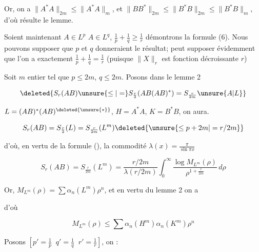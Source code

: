 Or, on a $\|A^*A\|_{2m}\leq\|A^*A\|_m$, et
$\|BB^*\|_{2m}\leq\|B^*B\|_{2m}\leq\|B^*B\|_m$, d'où résulte le lemme.

Soient maintenant  $A\in L^p$ $A\in L^q$, $\frac1p+\frac1q\geq\frac1r$ démontrons la formule (6). Nous pouvons supposer  que $p$ et $q$    donneraient le résultat;   peut supposer évidemment  que l'on a exactement $\frac1p+\frac1q=\frac1r$ (puisque $\|X\|_r$ est fonction décroissante  $r$)

Soit $m$  entier tel que $p\leq 2m$, $q\leq 2m$.  Posons  dans le lemme 2


\[
\deleted{S_r(AB)\unsure{\leq|=} S_{\frac r2}(AB(AB)^*)=S_{\frac r{2m}}\unsure{A|L}}
\]

$L=(AB)^*(AB)^{\deleted{\unsure{*}}}$, $H=A^*A$, $K=B^*B$, on aura.

\[
S_r(AB)=S_{\frac r2}(L)=S_{\frac r{2m}}(L^m)\deleted{\unsure{\leq p+2m|=r/2m}}
\]

d'où, en vertu de la formule (),   la commodité $\lambda(x)=\frac{\pi}{\sin\pi x}$

\[
S_r(AB)=S_{\frac r{2m}}(L^m)=\frac{r/2m}{\lambda(r/2m)}
\int_0^\infty\frac{\log M_{L^m}(\rho)}{\rho^{1+\frac r{2m}}}\,d\rho \tag*{(11)}
\]

 Or, $M_{L^m}(\rho)=\sum\alpha_n(L^m)\rho^n$, et   en vertu du lemme 2 on a 


d'où

\[
M_{L^m}(\rho)\leq\sum\alpha_n(H^m)\alpha_n(K^m)\rho^n
\]

Posons $\left[p'=\frac1p\;\;q'=\frac1q\;\;r'=\frac1r\right]$, on : 


